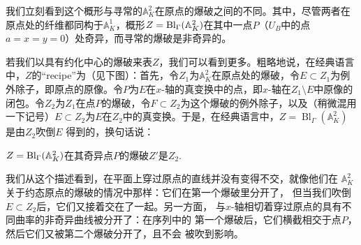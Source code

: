 我们立刻看到这个概形与寻常的$\mathbb A_K^2$在原点的爆破之间的不同。其中，尽管两者在原点处的纤维都同构于$\mathbb A_K^1$，概形$Z=\operatorname{Bl}_\Gamma(\mathbb{A}_K^2)$在其中一点$P$（$U_B$中的点$a=x=y=0$）处奇异，而寻常的爆破是非奇异的。


若我们以具有约化中心的爆破来表$Z$，我们可以看到更多。粗略地说，在经典语言中，$Z$的“recipe”\nottran 为（见下图）：首先，令$Z_1$为$\mathbb A_K^2$在原点处的爆破，令$E\subset Z_1$为例外除子，即原点的原像。令$P$为$E$在$x$-轴的真变换中的点，即$x$-轴在$Z_1\setminus E$中原像的闭包。令$Z_2$为$Z_1$在点$P$的爆破，令$F\subset Z_2$为这个爆破的例外除子，以及（稍微混用一下记号）$E\subset Z_2$为$E$在$Z_2$中的真变换。于是，在经典语言中，$Z=\operatorname{Bl}_\Gamma (\mathbb A_K^2)$是由$Z_2$吹倒$E$ 得到的，换句话说：

\begin{pro}\label{pro:4.40}
	$Z=\operatorname{Bl}_\Gamma(\mathbb A_K^2)$在其奇异点$P$的爆破$Z'$是$Z_2$.
\end{pro}



我们从这个描述看到，在平面上穿过原点的直线并没有变得不交，就像他们在
$\mathbb A_K^2$关于约态原点的爆破的情况中那样：它们在第一个爆破里分开了，
但当我们吹倒$E\subset Z_2$后，它们又接着交在了一起。另一方面，
与$x$-轴相切着穿过原点的具有不同曲率的非奇异曲线被分开了：在序列中的
第一个爆破后，它们横截相交于点$P$，然后它们又被第二个爆破分开了，且不会
被吹到影响。

